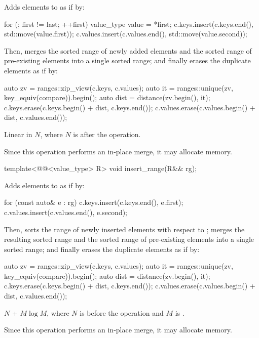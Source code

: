 \begin{itemdescr}
\pnum
\effects
Adds elements to  as if by:
\begin{codeblock}
for (; first != last; ++first) {
  value_type value = *first;
  c.keys.insert(c.keys.end(), std::move(value.first));
  c.values.insert(c.values.end(), std::move(value.second));
}
\end{codeblock}
Then, merges the sorted range of newly added elements and
the sorted range of pre-existing elements into a single sorted range; and
finally erases the duplicate elements as if by:
\begin{codeblock}
auto zv = ranges::zip_view(c.keys, c.values);
auto it = ranges::unique(zv, key_equiv(compare)).begin();
auto dist = distance(zv.begin(), it);
c.keys.erase(c.keys.begin() + dist, c.keys.end());
c.values.erase(c.values.begin() + dist, c.values.end());
\end{codeblock}

\pnum
\complexity
Linear in $N$, where $N$ is  after the operation.

\pnum
\remarks
Since this operation performs an in-place merge, it may allocate memory.
\end{itemdescr}

%
\begin{itemdecl}
template<@@<value_type> R>
  void insert_range(R&& rg);
\end{itemdecl}

\begin{itemdescr}
\pnum
\effects
Adds elements to  as if by:
\begin{codeblock}
for (const auto& e : rg) {
  c.keys.insert(c.keys.end(), e.first);
  c.values.insert(c.values.end(), e.second);
}
\end{codeblock}
Then, sorts the range of newly inserted elements
with respect to ;
merges the resulting sorted range and
the sorted range of pre-existing elements into a single sorted range; and
finally erases the duplicate elements as if by:
\begin{codeblock}
auto zv = ranges::zip_view(c.keys, c.values);
auto it = ranges::unique(zv, key_equiv(compare)).begin();
auto dist = distance(zv.begin(), it);
c.keys.erase(c.keys.begin() + dist, c.keys.end());
c.values.erase(c.values.begin() + dist, c.values.end());
\end{codeblock}

\pnum
\complexity
$N$ + $M \log M$,
where $N$ is  before the operation and
$M$ is .

\pnum
\remarks
Since this operation performs an in-place merge, it may allocate memory.
\end{itemdescr}

